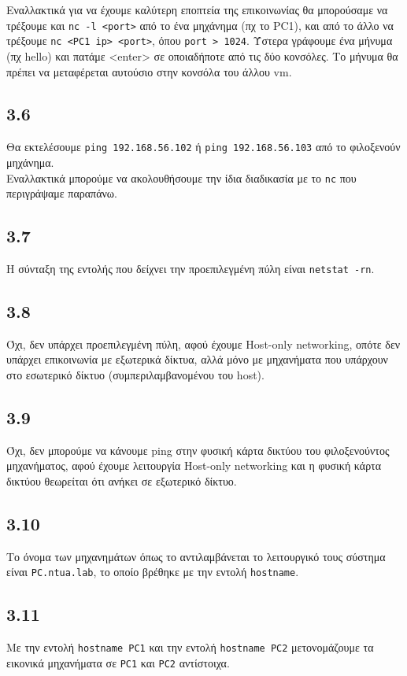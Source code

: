 \documentclass[a4paper, 12pt]{article}
\begin{document}
		Εναλλακτικά για να έχουμε καλύτερη εποπτεία της επικοινωνίας θα μπορούσαμε να τρέξουμε και \verb|nc -l <port>| από το ένα μηχάνημα (πχ το PC1), και από το άλλο να τρέξουμε \verb|nc <PC1 ip> <port>|, όπου \verb|port > 1024|. Ύστερα γράφουμε ένα μήνυμα (πχ hello) και πατάμε <enter> σε οποιαδήποτε από τις δύο κονσόλες. Το μήνυμα θα πρέπει να μεταφέρεται αυτούσιο στην κονσόλα του άλλου vm.  

	\subsection*{3.6}
		Θα εκτελέσουμε \verb|ping 192.168.56.102| ή \verb|ping 192.168.56.103| από το φιλοξενούν μηχάνημα. \\
		
		Εναλλακτικά μπορούμε να ακολουθήσουμε την ίδια διαδικασία με το \verb|nc| που περιγράψαμε παραπάνω.

	\subsection*{3.7}
		Η σύνταξη της εντολής που δείχνει την προεπιλεγμένη πύλη είναι \verb|netstat -rn|.

	\subsection*{3.8}
		Όχι, δεν υπάρχει προεπιλεγμένη πύλη, αφού έχουμε Host-only networking, οπότε δεν υπάρχει επικοινωνία με εξωτερικά δίκτυα, αλλά μόνο με μηχανήματα που υπάρχουν στο εσωτερικό δίκτυο (συμπεριλαμβανομένου του host).

	\subsection*{3.9}
		Όχι, δεν μπορούμε να κάνουμε ping στην φυσική κάρτα δικτύου του φιλοξενούντος μηχανήματος, αφού έχουμε λειτουργία Host-only networking και η φυσική κάρτα δικτύου θεωρείται ότι ανήκει σε εξωτερικό δίκτυο.

	\subsection*{3.10}
		Το όνομα των μηχανημάτων όπως το αντιλαμβάνεται το λειτουργικό τους σύστημα είναι \verb|PC.ntua.lab|, το οποίο βρέθηκε με την εντολή \verb|hostname|.

	\subsection*{3.11}
		Με την εντολή \verb|hostname PC1| και την εντολή \verb|hostname PC2| μετονομάζουμε τα εικονικά μηχανήματα σε \verb|PC1| και \verb|PC2| αντίστοιχα.
		
\end{document}
